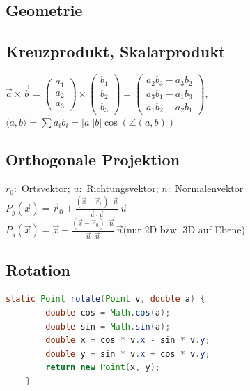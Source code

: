 \documentclass[10pt,a4paper,ngerman,oneside,]{article}
\begin{document}
\begin{multicols}{2}
\section{Geometrie}
\subsection{Kreuzprodukt, Skalarprodukt}
$\vec{a}\times\vec{b}
  =
  \begin{pmatrix}a_1 \\ a_2 \\ a_3\end{pmatrix}
  \times
  \begin{pmatrix}b_1 \\ b_2 \\ b_3 \end{pmatrix}
  =
  \begin{pmatrix}
    a_2b_3 - a_3b_2 \\
    a_3b_1 - a_1b_3 \\
    a_1b_2 - a_2b_1
  \end{pmatrix}$,~~$\langle a,b\rangle=\sum a_ib_i=|a||b|\cos(\angle(a,b))$
\subsection{Orthogonale Projektion}
$r_0:$ Ortsvektor; $u:$ Richtungsvektor; $n:$ Normalenvektor\\
$P_g(\vec x) =  \vec r_0 + \frac{( \vec x - \vec r_0 ) \cdot \vec u}{\vec u \cdot \vec u} \, \vec u$\\
$P_g(\vec x) = \vec x - \frac{( \vec x - \vec r_0 ) \cdot \vec n}{\vec n \cdot \vec n} \, \vec n$(nur 2D bzw. 3D auf Ebene)\\
\subsection{Rotation}
\begin{lstlisting}[language=java]
	static Point rotate(Point v, double a) {
		double cos = Math.cos(a);
		double sin = Math.sin(a);
		double x = cos * v.x - sin * v.y;
		double y = sin * v.x + cos * v.y;
		return new Point(x, y);
	}
\end{lstlisting}

\end{multicols}
\end{document}
